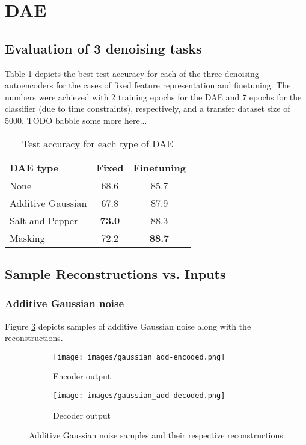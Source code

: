 \documentclass[10pt, a4paper]{article}
\title{\mytitle}
\author{\myauthor\hspace{1em}\\\contact\\University of Bern\hspace{0.5em}-\hspace{0.5em}\mymodule}
\date{}
\begin{document}
	\maketitle
    
	\section{DAE}
    \subsection{Evaluation of 3 denoising tasks}
    Table \ref{table:ta} depicts the best test accuracy for each of the three denoising autoencoders for the cases of fixed feature representation and finetuning. The numbers were achieved with 2 training epochs for the DAE and 7 epochs for the classifier (due to time constraints), respectively, and a transfer dataset size of 5000.
    TODO babble some more here...
    
    \begin{table}[h]
    \begin{center}
    \begin{tabular}{|l|c|c|}
    \hline
    DAE type & Fixed & Finetuning \\
    \hline\hline
    None & 68.6 & 85.7 \\
    Additive Gaussian & 67.8 & 87.9 \\
    Salt and Pepper & \textbf{73.0} & 88.3 \\
    Masking & 72.2 & \textbf{88.7} \\
    \hline
    \end{tabular}
    \end{center}
    \caption{Test accuracy for each type of DAE}
    \label{table:ta}
    \end{table}
    
    \subsection{Sample Reconstructions vs. Inputs}
    \subsubsection{Additive Gaussian noise}
    Figure \ref{fig:figag} depicts samples of additive Gaussian noise along with the reconstructions.
    
    \begin{figure}[h]
    \begin{subfigure}{0.2\textwidth}
    \texttt{[image: images/gaussian\_add-encoded.png]} 
    \caption{Encoder output}
    \label{fig:subim1}
    \end{subfigure}
    \begin{subfigure}{0.2\textwidth}
    \texttt{[image: images/gaussian\_add-decoded.png]}
    \caption{Decoder output}
    \label{fig:subim2}
    \end{subfigure}
    \caption{Additive Gaussian noise samples and their respective reconstructions}
    \label{fig:figag}
    \end{figure}
    
\end{document}
